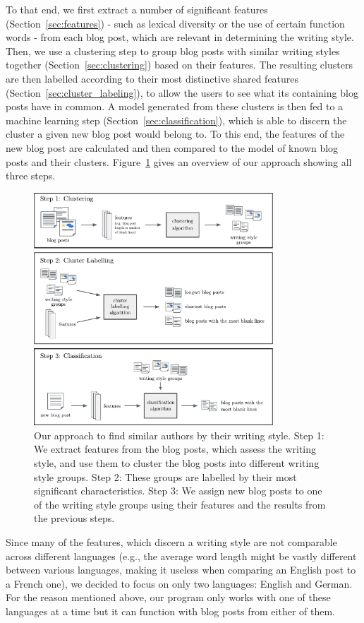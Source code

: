 To that end, we first extract a number of significant features (Section~\ref{sec:features}) - such as lexical diversity or the use of certain function words - from each blog post, which are relevant in determining the writing style.
Then, we use a clustering step to group blog posts with similar writing styles together (Section~\ref{sec:clustering}) based on their features.
The resulting clusters are then labelled according to their most distinctive shared features (Section~\ref{sec:cluster_labeling}), to allow the users to see what its containing blog posts have in common.
A model generated from these clusters is then fed to a machine learning step (Section~\ref{sec:classification}), which is able to discern the cluster a given new blog post would belong to.
To this end, the features of the new blog post are calculated and then compared to the model of known blog posts and their clusters.
Figure~\ref{fig:figure_1} gives an overview of our approach showing all three steps.

\begin{figure}[ht!]
    \centering
    \includegraphics[width=0.8\textwidth]{images/Figure_1.pdf}
    \caption{Our approach to find similar authors by their writing style. Step 1: We extract features from the blog posts, which assess the writing style, and use them to cluster the blog posts into different writing style groups. Step 2: These groups are labelled by their most significant characteristics. Step 3: We assign new blog posts to one of the writing style groups using their features and the results from the previous steps.}
    \label{fig:figure_1}
\end{figure}

Since many of the features, which discern a writing style are not comparable across different languages (e.g., the average word length might be vastly different between various languages, making it useless when comparing an English post to a French one), we decided to focus on only two languages: English and German.
For the reason mentioned above, our program only works with one of these languages at a time but it can function with blog posts from either of them.

